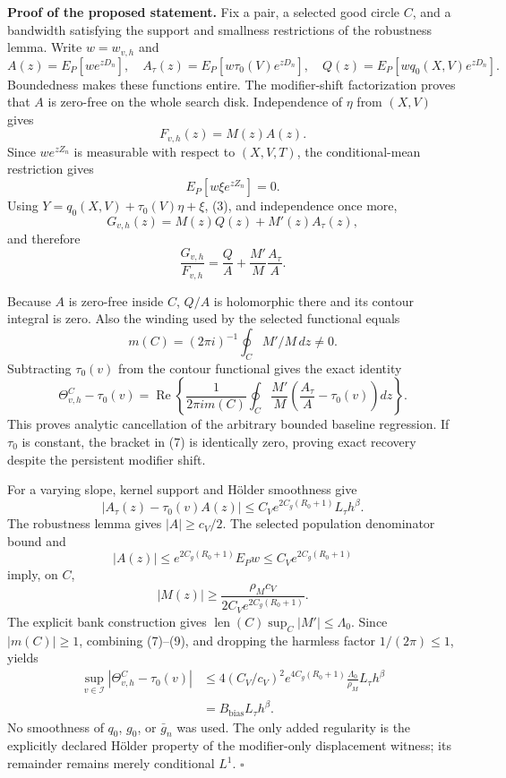 \textbf{Proof of the proposed statement.}
Fix a pair, a selected good circle \(C\), and a bandwidth satisfying the support and smallness restrictions of the robustness lemma. Write \(w=w_{v,h}\) and
\[
 A(z)=E_P[we^{zD_n}],\quad
 A_\tau(z)=E_P[w\tau_0(V)e^{zD_n}],\quad
 Q(z)=E_P[wq_0(X,V)e^{zD_n}]. \tag{1}
\]
Boundedness makes these functions entire. The modifier-shift factorization proves that \(A\) is zero-free on the whole search disk. Independence of \(\eta\) from \((X,V)\) gives
\[
 F_{v,h}(z)=M(z)A(z). \tag{2}
\]
Since \(we^{zZ_n}\) is measurable with respect to \((X,V,T)\), the conditional-mean restriction gives
\[
 E_P[w\xi e^{zZ_n}]=0. \tag{3}
\]
Using \(Y=q_0(X,V)+\tau_0(V)\eta+\xi\), (3), and independence once more,
\[
 G_{v,h}(z)=M(z)Q(z)+M'(z)A_\tau(z), \tag{4}
\]
and therefore
\[
 \frac{G_{v,h}}{F_{v,h}}
 =\frac QA+\frac{M'}M\frac{A_\tau}{A}. \tag{5}
\]

Because \(A\) is zero-free inside \(C\), \(Q/A\) is holomorphic there and its contour integral is zero. Also the winding used by the selected functional equals
\[
 m(C)=(2\pi i)^{-1}\oint_C M'/M\,dz\ne0. \tag{6}
\]
Subtracting \(\tau_0(v)\) from the contour functional gives the exact identity
\[
 \Theta^C_{v,h}-\tau_0(v)
 =\operatorname{Re}\left\{\frac1{2\pi i m(C)}
 \oint_C\frac{M'}M
 \left(\frac{A_\tau}{A}-\tau_0(v)\right)dz\right\}. \tag{7}
\]
This proves analytic cancellation of the arbitrary bounded baseline regression. If \(\tau_0\) is constant, the bracket in (7) is identically zero, proving exact recovery despite the persistent modifier shift.

For a varying slope, kernel support and H\"older smoothness give
\[
 |A_\tau(z)-\tau_0(v)A(z)|
 \le C_Ve^{2C_g(R_0+1)}L_\tau h^\beta. \tag{8}
\]
The robustness lemma gives \(|A|\ge c_V/2\). The selected population denominator bound and
\[
 |A(z)|\le e^{2C_g(R_0+1)}E_Pw
 \le C_Ve^{2C_g(R_0+1)}
\]
imply, on \(C\),
\[
 |M(z)|\ge
 \frac{\rho_Mc_V}{2C_Ve^{2C_g(R_0+1)}}. \tag{9}
\]
The explicit bank construction gives \(\operatorname{len}(C)\sup_C|M'|\le\Lambda_0\). Since \(|m(C)|\ge1\), combining (7)--(9), and dropping the harmless factor \(1/(2\pi)\le1\), yields
\[
\begin{aligned}
 \sup_{v\in\mathcal I}|\Theta^C_{v,h}-\tau_0(v)|
 &\le
 4(C_V/c_V)^2e^{4C_g(R_0+1)}
 \frac{\Lambda_0}{\rho_M}L_\tau h^\beta\\
 &=B_{\mathrm{bias}}L_\tau h^\beta. \tag{10}
\end{aligned}
\]
No smoothness of \(q_0\), \(g_0\), or \(\bar g_n\) was used. The only added regularity is the explicitly declared H\"older property of the modifier-only displacement witness; its remainder remains merely conditional \(L^1\). \(\square\)